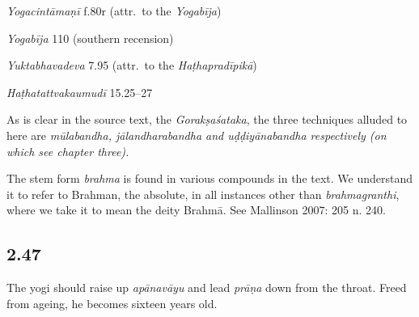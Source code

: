 \begin{ekdosis}
\begin{testimonia}[hp02_046]
\emph{Yogacintāmaṇī} f.80r (attr.~to the \emph{Yogabīja})

\begin{versinnote}
\end{versinnote}

\emph{Yogabīja} 110 (southern recension)
\begin{versinnote}
\end{versinnote}

\emph{Yuktabhavadeva} 7.95 (attr.~to the \emph{Haṭhapradīpikā})

\begin{versinnote}
\end{versinnote}

\emph{Haṭhatattvakaumudī} 15.25–27
\begin{versinnote}
\end{versinnote}
\end{testimonia}

\begin{philcomm}[hp02_046]
As is clear in the source text, the \emph{Gorakṣaśataka}, the three techniques alluded to here are \sl{mūlabandha, jālandharabandha} and \emph{uḍḍiyānabandha} respectively (on which see chapter three).\lb

The stem form \emph{brahma} is found in various compounds in the text. We understand it to refer to Brahman, the absolute, in all instances other than \emph{brahmagranthi}, where we take it to mean the deity Brahmā. See Mallinson 2007: 205 n. 240.
\end{philcomm}

\subsection*{2.47}
\begin{translation}[hp02_047]
The yogi should raise up \emph{apānavāyu} and lead \emph{prāṇa} down from the throat. Freed from ageing, he becomes sixteen years old.
\end{translation}


\end{ekdosis}
